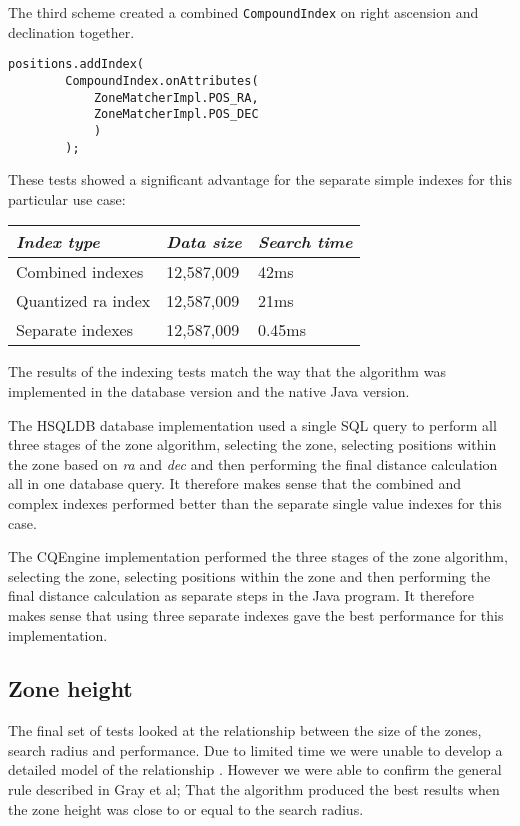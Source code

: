 \documentclass{article}
\newcommand{\hsqldb} {HSQLDB\xspace}
\newcommand{\cqengine} {CQEngine\xspace}
\begin{document}
The third scheme created a combined \texttt{CompoundIndex} on right ascension and declination together.

\begin{lstlisting}[style=Java]
    positions.addIndex(
        CompoundIndex.onAttributes(
            ZoneMatcherImpl.POS_RA,
            ZoneMatcherImpl.POS_DEC
            )
        );
\end{lstlisting}

These tests showed a significant advantage for the separate simple indexes for this particular use case:

\begin{table}[h]
\centering
\begin{tabular}{|l|l|l|}
\hline
\textit{Index type} & \textit{Data size} & \textit{Search time} \\ \hline
Combined indexes & 12,587,009 & 42ms \\ \hline
Quantized ra index & 12,587,009 & 21ms \\ \hline
Separate indexes & 12,587,009 & 0.45ms \\ \hline
\end{tabular}
\end{table}

The results of the indexing tests match the way that the algorithm was implemented in the database version and the native Java version.

The \hsqldb database implementation used a single SQL query to perform all three stages of the zone algorithm, selecting the zone, selecting positions within the zone based on \textit{ra} and \textit{dec} and then performing the final distance calculation all in one database query. It therefore makes sense that the combined and complex indexes performed better than the separate single value indexes for this case.

The \cqengine implementation performed the three stages of the zone algorithm, selecting the zone, selecting positions within the zone and then performing the final distance calculation as separate steps in the Java program.  It therefore makes sense that using three separate indexes gave the best performance for this implementation.

\subsection{Zone height}
\label{zone-height}

The final set of tests looked at the relationship between the size of the zones, search radius and performance. Due to limited time we were unable to develop a detailed model of the relationship . However we were able to confirm the general rule described in Gray et al; That the algorithm produced the best results when the zone height was close to or equal to the search radius. 
\end{document}
